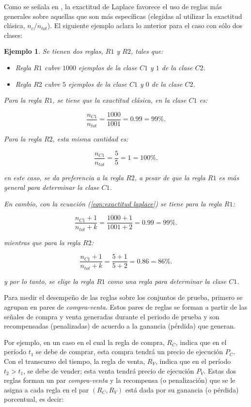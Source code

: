 \documentclass[12pt]{report}
\theoremstyle{break}
\newtheorem{ejemplo}{Ejemplo}[chapter]
\theoremstyle{break}
\begin{document}
Como se señala en \cite{CN2Improvements}, la exactitud de Laplace favorece el uso de reglas más generales sobre aquellas que son más específicas (elegidas al utilizar la exactitud clásica, $n_{c} / n_{tot} $). El siguiente ejemplo aclara lo anterior para el caso con sólo dos clases:

\begin{ejemplo}
Se tienen dos reglas, $R1$ y $R2$, tales que:

\begin{itemize} 
\item Regla $R1$ cubre $1000$ ejemplos de la clase $C1$ y $1$ de la clase $C2$.

\item Regla $R2$ cubre $5$ ejemplos de la clase $C1$ y $0$ de la clase $C2$.
\end{itemize}

Para la regla $R1$, se tiene que la exactitud clásica, en la clase $C1$ es:

$$ \dfrac{n_{C1}}{n_{tot}} = \dfrac{1000}{1001} = 0.99 = 99\%.$$

Para la regla $R2$, esta misma cantidad es:

$$ \dfrac{n_{C1}}{n_{tot}} = \dfrac{5}{5} = 1 = 100\%.$$

en este caso, se da preferencia a la regla $R2$, a pesar de que la regla $R1$ es más general para determinar la clase $C1$.

En cambio, con la ecuación (\ref{eqn:exactitud laplace}) se tiene para la regla $R1$:

$$ \dfrac{n_{C1} + 1}{n_{tot} + k} = \dfrac{1000 + 1}{1001 + 2} = 0.99 = 99\%.$$

mientras que para la regla $R2$:

$$ \dfrac{n_{C1} + 1}{n_{tot} + k} = \dfrac{5 + 1}{5 + 2} = 0.86 = 86\%.$$

y por lo tanto, se elige la regla $R1$ como una regla para determinar la clase $C1$.

\end{ejemplo}

Para medir el desempeño de las reglas sobre los conjuntos de prueba, primero se agrupan en pares de \textit{compra-venta}. Estos pares de reglas se forman a partir de las señales de compra y venta generadas durante el periodo de prueba y son recompensadas (penalizadas) de acuerdo a la ganancia (pérdida) que generan.

Por ejemplo, en un caso en el cual la regla de compra, $R_{C}$, indica que en el período $t_1$ se debe de comprar, esta compra tendrá un precio de ejecución $P_{C}$. Con el transcurso del tiempo, la regla de venta, $R_{V}$, indica que en el período $t_2 > t_1$, se debe de vender; esta venta tendrá precio de ejecución $P_{V}$. Estas dos reglas forman un par \textit{compra-venta} y la recompensa (o penalización) que se le asigna a cada regla en el par $\left(R_C, R_V\right)$ está dada por su ganancia (o pérdida) porcentual, es decir:
\end{document}
